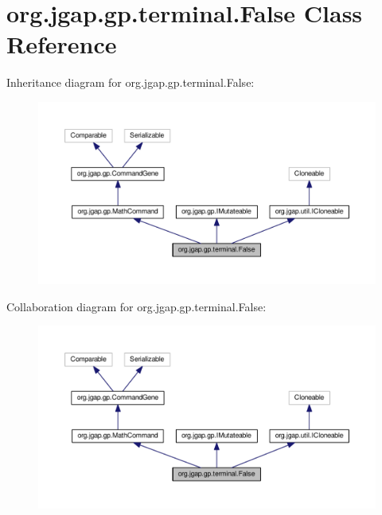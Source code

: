 \hypertarget{classorg_1_1jgap_1_1gp_1_1terminal_1_1_false}{\section{org.\-jgap.\-gp.\-terminal.\-False Class Reference}
\label{classorg_1_1jgap_1_1gp_1_1terminal_1_1_false}
}


Inheritance diagram for org.\-jgap.\-gp.\-terminal.\-False\-:
\nopagebreak
\begin{figure}[H]
\begin{center}
\leavevmode
\includegraphics[width=350pt]{classorg_1_1jgap_1_1gp_1_1terminal_1_1_false__inherit__graph}
\end{center}
\end{figure}


Collaboration diagram for org.\-jgap.\-gp.\-terminal.\-False\-:
\nopagebreak
\begin{figure}[H]
\begin{center}
\leavevmode
\includegraphics[width=350pt]{classorg_1_1jgap_1_1gp_1_1terminal_1_1_false__coll__graph}
\end{center}
\end{figure}
